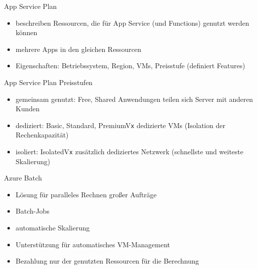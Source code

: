 \begin{flashcard}[]{App Service Plan}
  \begin{itemize}
    \item beschreiben Ressourcen, die für App Service (und Functions) genutzt werden können
    \item mehrere Apps in den gleichen Ressourcen
    \item Eigenschaften: Betriebssystem, Region, VMs, Preisstufe (definiert Features)
  \end{itemize}
\end{flashcard}

\begin{flashcard}[]{App Service Plan Preisstufen}
  \begin{itemize}
    \item gemeinsam genutzt: Free, Shared\newline
      Anwendungen teilen sich Server mit anderen Kunden
    \item dediziert: Basic, Standard, PremiumV\texttt{x}\newline
      dedizierte VMs (Isolation der Rechenkapazität)
    \item isoliert: IsolatedV\texttt{x}\newline
      zusätzlich dediziertes Netzwerk (schnellste und weiteste Skalierung)
  \end{itemize}
\end{flashcard}

\begin{flashcard}[]{Azure Batch}
  \begin{itemize}
    \item Lösung für paralleles Rechnen großer Aufträge
    \item Batch-Jobs
    \item automatische Skalierung
    \item Unterstützung für automatisches VM-Management
    \item Bezahlung nur der genutzten Ressourcen für die Berechnung
  \end{itemize}
\end{flashcard}

